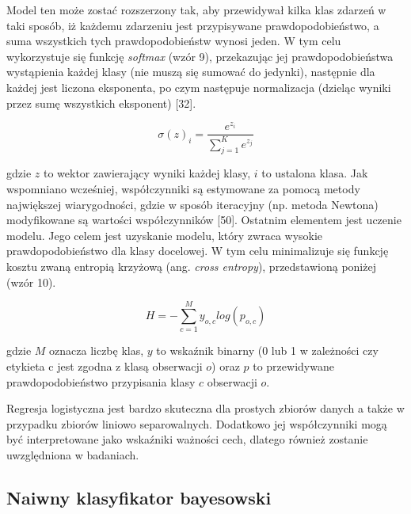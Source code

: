 \noindent Model ten może zostać rozszerzony tak, aby przewidywał kilka klas zdarzeń w taki sposób, iż każdemu zdarzeniu jest przypisywane prawdopodobieństwo, a suma wszystkich tych prawdopodobieństw wynosi jeden. W tym celu wykorzystuje się funkcję \textit{softmax} (wzór 9), przekazując jej prawdopodobieństwa wystąpienia każdej klasy (nie muszą się sumować do jedynki), następnie dla każdej jest liczona eksponenta, po czym następuje normalizacja (dzieląc wyniki przez sumę wszystkich eksponent) [32].

\begin{equation}
\sigma(z)_i=\frac {e^{z_i}} { 
    \sum \limits_{j=1}^{K} e^{z_j}}
\end{equation}

\noindent gdzie $z$ to wektor zawierający wyniki każdej klasy, $i$ to ustalona klasa. Jak wspomniano wcześniej, współczynniki są estymowane za pomocą metody największej wiarygodności, gdzie w sposób iteracyjny (np. metoda Newtona) modyfikowane są wartości współczynników [50]. Ostatnim elementem jest uczenie modelu. Jego celem jest uzyskanie modelu, który zwraca wysokie prawdopodobieństwo dla klasy docelowej. W tym celu minimalizuje się funkcję kosztu zwaną entropią krzyżową (ang. \textit{cross entropy}), przedstawioną poniżej (wzór 10). 

\begin{equation}
	H=-\sum \limits_{c=1}^{M}y_{o,c}log(p_{o,c})
\end{equation}

\noindent gdzie $M$ oznacza liczbę klas, $y$ to wskaźnik binarny (0 lub 1 w zależności czy etykieta c jest zgodna z klasą obserwacji $o$) oraz $p$ to przewidywane prawdopodobieństwo przypisania klasy $c$ obserwacji $o$.

Regresja logistyczna jest bardzo skuteczna dla prostych zbiorów danych a także w przypadku zbiorów liniowo separowalnych. Dodatkowo jej współczynniki mogą być interpretowane jako wskaźniki ważności cech, dlatego również zostanie uwzględniona w badaniach.



\subsection{Naiwny klasyfikator bayesowski}
\label{cha:Naiwny klasyfikator bayesowski}

